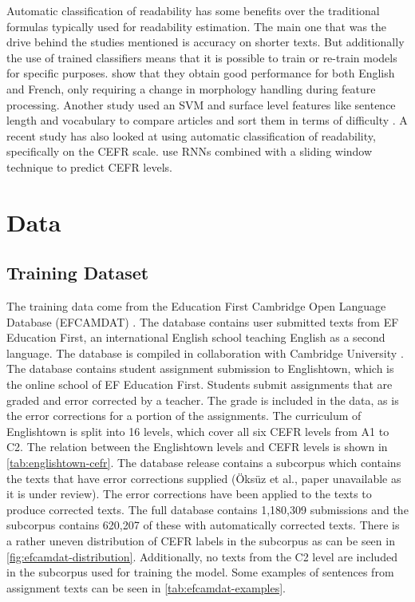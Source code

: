 \documentclass[11pt,a4paper]{article}
\begin{document}
Automatic classification of readability has some benefits over the traditional
formulas typically used for readability estimation. The main one that was the
drive behind the studies mentioned is accuracy on shorter texts. But
additionally the use of trained classifiers means that it is possible to train
or re-train models for specific purposes.
\parencite{collins-thompson-callan-2004-language} show that they obtain good
performance for both English and French, only requiring a change in morphology
handling during feature processing. Another study used an SVM and surface level
features like sentence length and vocabulary to compare articles and sort them
in terms of difficulty \parencite{10.1162/coli.09-036-R2-08-050}. A recent study has also looked at using
automatic classification of readability, specifically on the CEFR scale.
\parencite{kerz-etal-2021-automated} use RNNs combined with a sliding window
technique to predict CEFR levels.

\section{Data}

\subsection{Training Dataset}

The training data come from the Education First Cambridge Open Language
Database (EFCAMDAT) \parencite{inbook}. The database
contains user submitted texts from EF Education First, an international English school teaching English as a second language. The database is compiled
in collaboration with Cambridge University \parencite{hgbka17}. The database
contains student assignment submission to Englishtown, which is the online
school of EF Education First. Students submit assignments that are graded and
error corrected by a teacher. The grade is included in the data, as is the
error corrections for a portion of the assignments. The curriculum of
Englishtown is split into 16 levels, which cover all six CEFR levels from A1
to C2. The relation between the Englishtown levels and CEFR levels is shown in
\autoref{tab:englishtown-cefr}. The database release contains a subcorpus which contains the texts that
have error corrections supplied (Öksüz et al., paper unavailable as it is under
review). The error corrections have been applied to the texts to produce
corrected texts. The full database contains 1,180,309 submissions and the
subcorpus contains 620,207 of these with automatically corrected texts. There
is a rather uneven distribution of CEFR labels in the subcorpus as can be seen
in \autoref{fig:efcamdat-distribution}. Additionally, no texts from the C2 level
are included in the subcorpus used for training the model. Some examples of
sentences from assignment texts can be seen in \autoref{tab:efcamdat-examples}.
\end{document}
